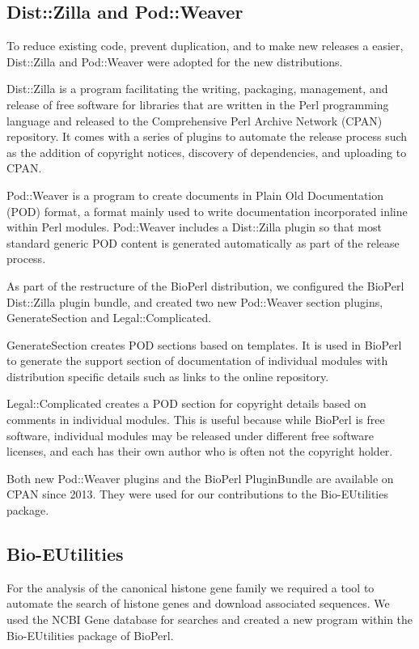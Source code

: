 \subsection{Dist::Zilla and Pod::Weaver}

To reduce existing code, prevent duplication,
and to make new releases
a easier, Dist::Zilla and Pod::Weaver were adopted for
the new distributions.

Dist::Zilla is a program facilitating the writing, packaging, management,
and release of free software for libraries that are written in the Perl
programming language and released to the Comprehensive Perl Archive
Network (CPAN) repository.  It comes with a series of plugins to automate the
release process such as the addition of copyright notices, discovery
of dependencies, and uploading to CPAN.

Pod::Weaver is a program to create documents in Plain Old
Documentation (POD) format, a format mainly used to write
documentation incorporated inline within Perl modules.
Pod::Weaver includes a Dist::Zilla plugin
so that most standard generic POD content is
generated automatically as part of the release process.

As part of the restructure of the BioPerl distribution, we configured
the BioPerl Dist::Zilla plugin bundle, and created two new Pod::Weaver
section plugins, GenerateSection and Legal::Complicated.

GenerateSection creates POD sections based on templates.  It is
used in BioPerl to generate the support section of documentation
of individual modules
with distribution specific details such as links to the online
repository.

Legal::Complicated creates a POD section for copyright details
based on comments in individual modules.  This is useful because while
BioPerl is free
software, individual modules may be released under different free
software licenses, and each has their own author who is often not
the copyright holder.

Both new Pod::Weaver plugins and the BioPerl PluginBundle are available
on CPAN since 2013.  They were used for our contributions to the
Bio-EUtilities package.

\subsection{Bio-EUtilities}

For the analysis of the canonical histone gene
family  we required a tool to
automate the search of histone genes and download associated sequences.
We used the NCBI Gene database for searches and
created a new program 
within the Bio-EUtilities package of BioPerl.

